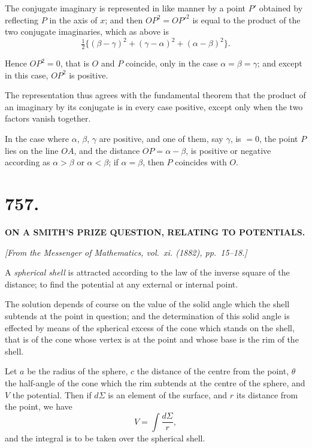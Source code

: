 \documentclass[12pt,a4paper]{article}
\begin{document}
The conjugate imaginary is represented in like manner by a point $P'$
obtained by reflecting $P$ in the axis of $x$; and then $OP^2 = OP'^2$ is equal
to the product of the two conjugate imaginaries, which as above is
%
\[
\tfrac{1}{2}\{ (\beta-\gamma)^2 + (\gamma-\alpha)^2 + (\alpha-\beta)^2 \}.
\]

Hence $OP^2 = 0$, that is $O$ and $P$ coincide, only in the case $\alpha = \beta = \gamma$;
and except in this case, $OP^2$ is positive.

The representation thus agrees with the fundamental theorem that the
product of an imaginary by its conjugate is in every case positive, except
only when the two factors vanish together.

In the case where $\alpha$, $\beta$, $\gamma$ are positive, and one of them, say $\gamma$, is $=0$,
the point $P$ lies on the line $OA$, and the distance $OP = \alpha - \beta$, is positive
or negative according as $\alpha > \beta$ or $\alpha < \beta$; if $\alpha = \beta$, then $P$ coincides with $O$.

\newpage


\section*{757.}

\begin{center}
\textbf{ON A SMITH'S PRIZE QUESTION, RELATING TO POTENTIALS.}
\end{center}

\begin{flushright}
\textit{[From the Messenger of Mathematics, vol.~xi. (1882), pp.~15--18.]}
\end{flushright}

A \textit{spherical shell} is attracted according to the law of the inverse square
of the distance; to find the potential at any external or internal point.

The solution depends of course on the value of the solid angle which the
shell subtends at the point in question; and the determination of this solid
angle is effected by means of the spherical excess of the cone which stands
on the shell, that is of the cone whose vertex is at the point and whose base
is the rim of the shell.

Let $a$ be the radius of the sphere, $c$ the distance of the centre from the
point, $\theta$ the half-angle of the cone which the rim subtends at the centre of
the sphere, and $V$ the potential. Then if $d\Sigma$ is an element of the surface,
and $r$ its distance from the point, we have
%
\[
V = \int \frac{d\Sigma}{r},
\]
%
and the integral is to be taken over the spherical shell.
\end{document}
